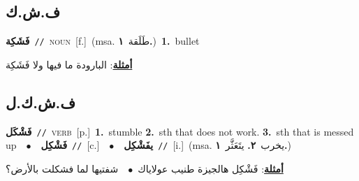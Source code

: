 \documentclass[10pt,a4paper,twoside]{article} %
\begin{document}
\begin{multicols}{2}
\vspace{-3mm}
\subsection*{\color{blue}\foreignlanguage{arabic}{ف.ش.ك}\color{blue}{}} 

{\setlength\topsep{0pt}\textbf{\foreignlanguage{arabic}{فَشَكِة}}\ {\color{gray}\texttt{//}\color{black}}\ \textsc{noun}\ [f.]\ \color{gray}(msa. \foreignlanguage{arabic}{طَلَقة}~\foreignlanguage{arabic}{\textbf{١.}})\color{black}\ \textbf{1.}~bullet\  \begin{flushright}\color{gray}\foreignlanguage{arabic}{\textbf{\underline{\foreignlanguage{arabic}{أمثلة}}}: البارودة ما فيها ولا فَشَكِة}\end{flushright}\color{black}} \vspace{2mm}

\vspace{-3mm}
\subsection*{\color{blue}\foreignlanguage{arabic}{ف.ش.ك.ل}\color{blue}{}} 

{\setlength\topsep{0pt}\textbf{\foreignlanguage{arabic}{فَشْكَل}}\ {\color{gray}\texttt{//}\color{black}}\ \textsc{verb}\ [p.]\ \textbf{1.}~stumble  \textbf{2.}~sth that does not work.  \textbf{3.}~sth that is messed up\ \ $\bullet$\ \ \setlength\topsep{0pt}\textbf{\foreignlanguage{arabic}{فَشْكِل}}\ {\color{gray}\texttt{//}\color{black}}\ [c.]\ \ $\bullet$\ \ \setlength\topsep{0pt}\textbf{\foreignlanguage{arabic}{يفَشْكِل}}\ {\color{gray}\texttt{//}\color{black}}\ [i.]\ \color{gray}(msa. \foreignlanguage{arabic}{يخرب}~\foreignlanguage{arabic}{\textbf{٢.}}  \foreignlanguage{arabic}{يتَعَثَّر}~\foreignlanguage{arabic}{\textbf{١.}})\color{black}\  \begin{flushright}\color{gray}\foreignlanguage{arabic}{\textbf{\underline{\foreignlanguage{arabic}{أمثلة}}}: فَشْكِل هالجيزة طنيب عولاياك\ $\bullet$\ \  شفتيها لما فشكلت بالأرض؟}\end{flushright}\color{black}} \vspace{2mm}


\end{multicols}
\end{document}
